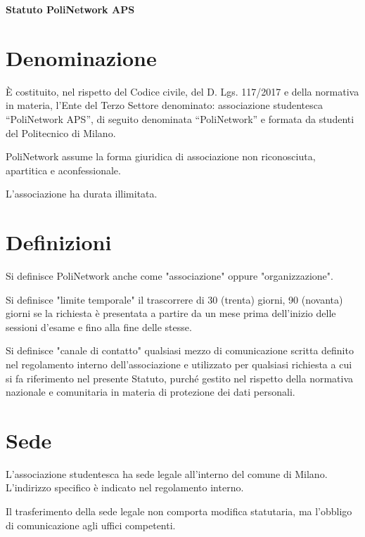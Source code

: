 \documentclass[legalpaper, 11pt]{exam}
\let\tempone\enumerate
\let\temptwo\endenumerate
\renewenvironment{enumerate}{\tempone\addtolength{\itemsep}{-0.45\baselineskip}}{\temptwo}
\begin{document}
\linenumbers

{

\begin{center}


\begin{center}
{\textbf{Statuto PoliNetwork APS}}

\end{center}



\end{center}


\section{Denominazione}
\begin{enumerate}
 \item È costituito, nel rispetto del Codice civile, del D. Lgs. 117/2017 e della normativa in materia, l’Ente del Terzo Settore denominato: associazione studentesca “PoliNetwork APS”, di seguito denominata “PoliNetwork” e formata da studenti del Politecnico di Milano.
 \item PoliNetwork assume la forma giuridica di associazione non riconosciuta, apartitica e aconfessionale.
 \item L'associazione ha durata illimitata.
\end{enumerate}

\section{Definizioni}
\begin{enumerate}
 \item Si definisce PoliNetwork anche come "associazione" oppure "organizzazione".
 \item Si definisce "limite temporale" il trascorrere di 30 (trenta) giorni, 90 (novanta) giorni se la richiesta è presentata a partire da un mese prima dell'inizio delle sessioni d'esame e fino alla fine delle stesse.
 \item Si definisce "canale di contatto" qualsiasi mezzo di comunicazione scritta definito nel regolamento interno dell'associazione e utilizzato per qualsiasi richiesta a cui si fa riferimento nel presente Statuto, purché gestito nel rispetto della normativa nazionale e comunitaria in materia di protezione dei dati personali.
\end{enumerate}

\section{Sede}
\begin{enumerate}
 \item L’associazione studentesca ha sede legale all'interno del comune di Milano. L'indirizzo specifico è indicato nel regolamento interno.
 \item Il trasferimento della sede legale non comporta modifica statutaria, ma l’obbligo di comunicazione agli uffici competenti.
\end{enumerate}

}
\end{document}
